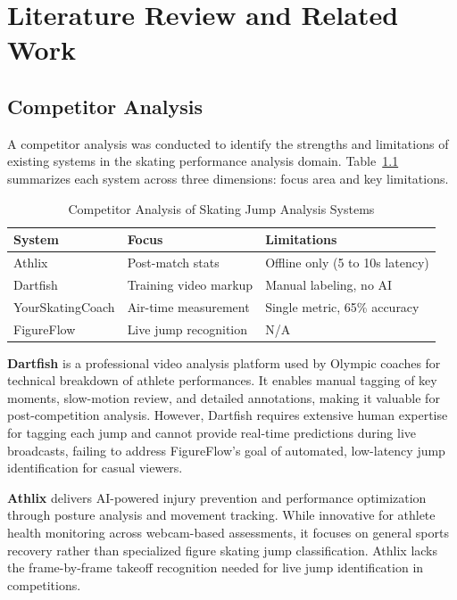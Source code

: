 \chapter{Literature Review and Related Work}
\label{chap:relatedworks}

\section{Competitor Analysis}
\label{section:competitor-analysis}

A competitor analysis was conducted to identify the strengths and
limitations of existing systems in the skating performance analysis
domain. Table~\ref{tab:competitor} summarizes each system across
three dimensions: focus area and key limitations.

\begin{table}[h]
    \centering
    \renewcommand{\arraystretch}{1.3}
    \caption{Competitor Analysis of Skating Jump Analysis Systems}
    \label{tab:competitor}
    \begin{tabular}{|l|l|l|}
        \hline
        \textbf{System}
            & \textbf{Focus}
            & \textbf{Limitations} \\
        \hline
        Athlix
            & Post-match stats
            & Offline only (5 to 10s latency) \\
        \hline
        Dartfish
            & Training video markup
            & Manual labeling, no AI \\
        \hline
        YourSkatingCoach
            & Air-time measurement
            & Single metric, 65\% accuracy \\
        \hline
        FigureFlow
            & Live jump recognition
            & N/A \\
        \hline
    \end{tabular}
\end{table}

\textbf{Dartfish} is a professional video analysis platform used by Olympic coaches for technical breakdown of athlete performances. It enables manual tagging of key moments, slow-motion review, and detailed annotations, making it valuable for post-competition analysis. However, Dartfish requires extensive human expertise for tagging each jump and cannot provide real-time predictions during live broadcasts, failing to address FigureFlow's goal of automated, low-latency jump identification for casual viewers.

\textbf{Athlix} delivers AI-powered injury prevention and performance optimization through posture analysis and movement tracking. While innovative for athlete health monitoring across webcam-based assessments, it focuses on general sports recovery rather than specialized figure skating jump classification. Athlix lacks the frame-by-frame takeoff recognition needed for live jump identification in competitions.

